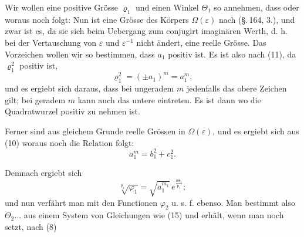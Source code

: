 Wir wollen eine positive Grösse $\varrho_1$ und einen Winkel $\Theta_1$ so
annehmen, dass
oder
woraus noch folgt:
Nun ist
eine Grösse des Körpers $\Omega(\varepsilon)$ nach (\S.\,164, 3.), und zwar ist es,
da sie sich beim Uebergang zum conjugirt imaginären Werth,
d. h. bei der Vertauschung von $\varepsilon$ und $\varepsilon^{-1}$ nicht ändert, eine
reelle Grösse. Das Vorzeichen wollen wir so bestimmen, dass $a_1$
positiv ist. Es ist also nach (11), da $\varrho_1^2$ positiv ist,
\[
\varrho_1^2 = (\pm a_1)^m = a_1^m,
\]
und es ergiebt sich daraus, dass bei ungeradem $m$ jedenfalls das
obere Zeichen gilt; bei geradem $m$ kann auch das untere eintreten. Es ist dann
wo die Quadratwurzel positiv zu nehmen ist.

Ferner sind aus gleichem Grunde
reelle Grössen in $\Omega(\varepsilon)$, und es ergiebt sich aus (10)
woraus noch die Relation folgt:
\[
a_1^m = b_1^2 + c_1^2.
\]

Demnach ergiebt sich
\[
\sqrt[p_1]{\varphi_1} = \sqrt{a_1^{m_1}}\, e^{\frac{i\Theta_1}{p_1}};
\]
und nun verfährt man mit den Functionen $\varphi_2$ u. s. f. ebenso.
Man bestimmt also $\Theta_2 \ldots$ aus einem System von Gleichungen
wie (15) und erhält, wenn man noch
setzt, nach (8)
